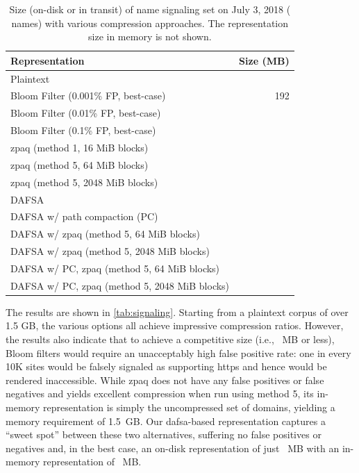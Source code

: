 \begin{table}[tbp]
  \centering
  \caption{Size (on-disk or in transit) of \ac{name} signaling set on
    July 3, 2018 (\numnames{} names) with various compression approaches. The
    representation size in memory is not shown.}
  \begin{tabular}{|lr|}
    \toprule
    \textbf{Representation} & \textbf{Size (MB)} \\
    \midrule
    Plaintext & \plaintextsize \\
    \midrule
    Bloom Filter (0.001\% FP, best-case) & 192 \\
    Bloom Filter (0.01\% FP, best-case) & \bloomlargesize \\
    Bloom Filter (0.1\% FP, best-case) & \bloommedsize \\
    \midrule
    zpaq (method 1, 16 MiB blocks) & \zpaqlargesize \\
    zpaq (method 5, 64 MiB blocks) & \zpaqmedsize \\
    zpaq (method 5, 2048 MiB blocks) & \zpaqsmallsize \\
    \midrule
    DAFSA & \fsalargesize \\
    DAFSA w/ path compaction (PC) & \fsamedsize \\
    DAFSA w/ zpaq (method 5, 64 MiB blocks) & \fsazpaqlargesize \\
    DAFSA w/ zpaq (method 5, 2048 MiB blocks) & \fsazpaqmedsize \\
    DAFSA w/ PC, zpaq (method 5, 64 MiB blocks) & \fsapczpaqlargesize \\
    DAFSA w/ PC, zpaq (method 5, 2048 MiB blocks) & \fsapczpaqmedsize \\
    \bottomrule
  \end{tabular}
  \label{tab:signaling}
\end{table}

The results are shown in \autoref{tab:signaling}. Starting from a plaintext
corpus of over 1.5 GB, the various options all achieve impressive compression
ratios. However, the results also indicate that to achieve a competitive size
(i.e., \bloomlargesize{}~MB or less), Bloom filters would require an
unacceptably high false positive rate: one in every 10K sites would be falsely
signaled as supporting \ac{https} and hence would be rendered inaccessible.
While zpaq does not have any false positives or false negatives and yields
excellent compression when run using method 5, its in-memory representation is
simply the uncompressed set of domains, yielding a memory requirement of 1.5~GB.
Our \ac{dafsa}-based representation captures a ``sweet spot'' between these two
alternatives, suffering no false positives or negatives and, in the best case,
an on-disk representation of just \fsapczpaqmedsize{}~MB with an in-memory
representation of \fsamedsize{}~MB.

